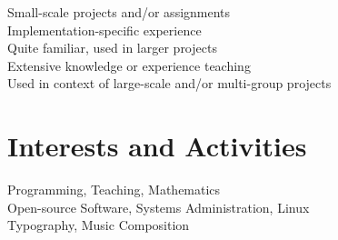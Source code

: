\documentclass[a4paper,10pt]{article}
\begin{document}
\vspace{1em}

\begin{center}
  \parbox{10cm}{
    \onenote Small-scale projects and/or assignments \\
    \twonotes Implementation-specific experience \\
    \threenotes Quite familiar, used in larger projects \\
    \fournotes Extensive knowledge or experience teaching \\
    \fivenotes Used in context of large-scale and/or multi-group projects}
\end{center}

\vspace{1em}

\section{Interests and Activities}
Programming, Teaching, Mathematics\\
Open-source Software, Systems Administration, Linux\\
Typography, Music Composition

\end{document}
